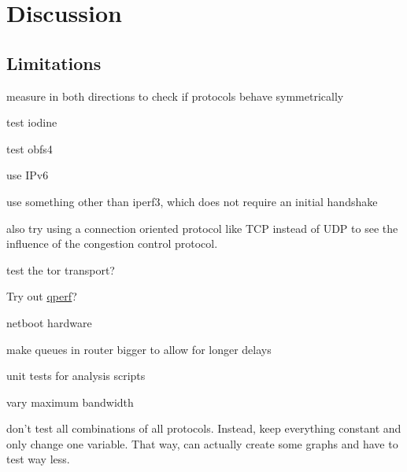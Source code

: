 
\chapter{Discussion}
\label{chap:discussion}
\section{Limitations}

measure in both directions to check if protocols behave symmetrically

test iodine

test obfs4

use IPv6

use something other than iperf3, which does not require an initial handshake

also try using a connection oriented protocol like TCP instead of UDP to see the influence of the congestion control protocol.

test the tor transport? 

Try out \href{https://github.com/rbruenig/qperf}{qperf}?

netboot hardware

make queues in router bigger to allow for longer delays

unit tests for analysis scripts

vary maximum bandwidth

don't test all combinations of all protocols.
Instead, keep everything constant and only change one variable.
That way, can actually create some graphs and have to test way less.
